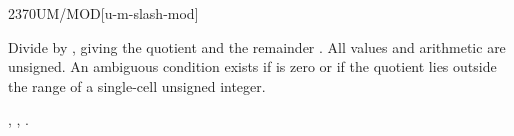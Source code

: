 \vspace*{-3ex}
\begin{worddef}{2370}{UM/MOD}[u-m-slash-mod]
\item {}

	Divide  by , giving the quotient 
	and the remainder . All values and arithmetic are
	unsigned. An ambiguous condition exists if  is zero or
	if the quotient lies outside the range of a single-cell unsigned
	integer.

\see {},
	,
	.

	\begin{testing} %
		 \\
		 \\
		 \\
		 \\
		 \\
		 \\
	\end{testing}
\end{worddef}

